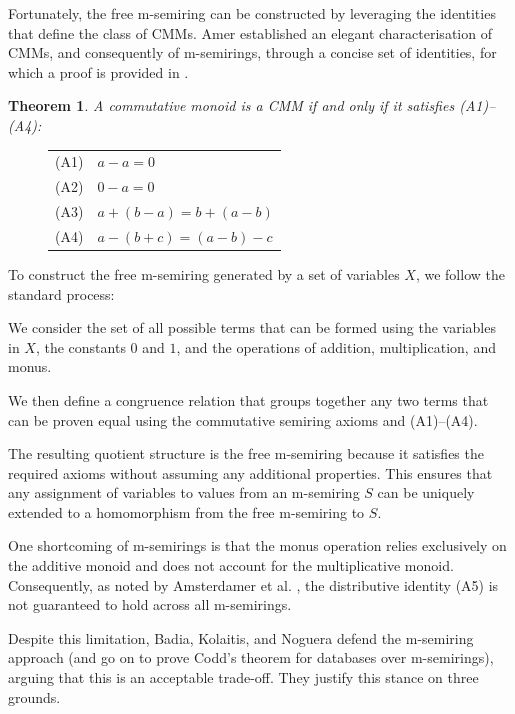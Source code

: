 \documentclass[oneside, 11pt]{amsbook}
\theoremstyle{plain}
\newtheorem{thm}{Theorem}[section]
\theoremstyle{definition}
\theoremstyle{remark}
\begin{document}
Fortunately, the free m-semiring can be constructed by leveraging the identities that define the class of CMMs. Amer \cite{Amer1984} established an elegant characterisation of CMMs, and consequently of m-semirings, through a concise set of identities, for which a proof is provided in \cite{Suciu2024}.

\begin{thm}
    A commutative monoid is a CMM if and only if it satisfies (A1)--(A4):
\end{thm}
\begin{figure}[htbp]
    \centering
    \begin{tabular}{ll}
        (A1) & $a - a = 0$                 \\
        (A2) & $0 - a = 0$                 \\
        (A3) & $a + (b - a) = b + (a - b)$ \\
        (A4) & $a - (b + c) = (a - b) - c$ \\
    \end{tabular}
\end{figure}

To construct the free m-semiring generated by a set of variables $X$, we follow the standard process:

We consider the set of all possible terms that can be formed using the variables in $X$, the constants $0$ and $1$, and the operations of addition, multiplication, and monus.

We then define a congruence relation that groups together any two terms that can be proven equal using the commutative semiring axioms and (A1)--(A4).

The resulting quotient structure is the free m-semiring because it satisfies the required axioms without assuming any additional properties. This ensures that any assignment of variables to values from an m-semiring $S$ can be uniquely extended to a homomorphism from the free m-semiring to $S$.

One shortcoming of m-semirings is that the monus operation relies exclusively on the additive monoid and does not account for the multiplicative monoid. Consequently, as noted by Amsterdamer et al. \cite{Amsterdamer2011a}, the distributive identity (A5) is not guaranteed to hold across all m-semirings.

Despite this limitation, Badia, Kolaitis, and Noguera \cite{Badia2025} defend the m-semiring approach (and go on to prove Codd's theorem for databases over m-semirings), arguing that this is an acceptable trade-off. They justify this stance on three grounds.
\end{document}
